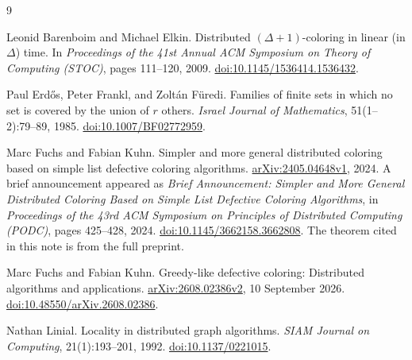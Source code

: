 \documentclass[11pt,a4paper]{article}
\numberwithin{equation}{section}
\begin{document}
\begin{thebibliography}{9}

Leonid Barenboim and Michael Elkin.
\newblock Distributed \((\Delta+1)\)-coloring in linear (in \(\Delta\)) time.
\newblock In \emph{Proceedings of the 41st Annual ACM Symposium on
Theory of Computing (STOC)}, pages 111--120, 2009.
\newblock \href{https://doi.org/10.1145/1536414.1536432}
{doi:10.1145/1536414.1536432}.

Paul Erd\H{o}s, Peter Frankl, and Zolt\'an F\"uredi.
\newblock Families of finite sets in which no set is covered by the
union of \(r\) others.
\newblock \emph{Israel Journal of Mathematics}, 51(1--2):79--89, 1985.
\newblock \href{https://doi.org/10.1007/BF02772959}
{doi:10.1007/BF02772959}.

Marc Fuchs and Fabian Kuhn.
\newblock Simpler and more general distributed coloring based on simple
list defective coloring algorithms.
\newblock \href{https://arxiv.org/abs/2405.04648v1}
{arXiv:2405.04648v1}, 2024.
\newblock A brief announcement appeared as
\emph{Brief Announcement: Simpler and More General Distributed Coloring
Based on Simple List Defective Coloring Algorithms},
in \emph{Proceedings of the 43rd ACM Symposium on Principles of Distributed
Computing (PODC)}, pages 425--428, 2024.
\newblock \href{https://doi.org/10.1145/3662158.3662808}
{doi:10.1145/3662158.3662808}.
\newblock The theorem cited in this note is from the full preprint.

Marc Fuchs and Fabian Kuhn.
\newblock Greedy-like defective coloring: Distributed algorithms and
applications.
\newblock \href{https://arxiv.org/abs/2608.02386v2}
{arXiv:2608.02386v2}, 10 September 2026.
\newblock \href{https://doi.org/10.48550/arXiv.2608.02386}
{doi:10.48550/arXiv.2608.02386}.

Nathan Linial.
\newblock Locality in distributed graph algorithms.
\newblock \emph{SIAM Journal on Computing}, 21(1):193--201, 1992.
\newblock \href{https://doi.org/10.1137/0221015}
{doi:10.1137/0221015}.

\end{thebibliography}
\end{document}
